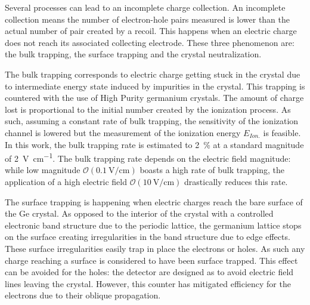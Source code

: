 Several processes can lead to an incomplete charge collection. An incomplete collection means the number of electron-hole pairs measured is lower than the actual number of pair created by a recoil. This happens when an electric charge does not reach its associated collecting electrode. These three phenomenon are: the bulk trapping, the surface trapping and the crystal neutralization.

The bulk trapping corresponds to electric charge getting stuck in the crystal due to intermediate energy state induced by impurities in the crystal. This trapping is countered with the use of High Purity germanium crystals. The amount of charge lost is proportional to the initial number created by the ionization process. As such, assuming a constant rate of bulk trapping, the sensitivity of the ionization channel is lowered but the measurement of the ionization energy $E_{Ion.}$ is feasible. In this work, the bulk trapping rate is estimated to \SI{2}{\percent} at a standard magnitude of \SI{2}{\volt\per\cm}. The bulk trapping rate depends on the electric field magnitude: while low magnitude $\mathcal{O}(\SI{0.1}{\volt\per\cm})$ boasts a high rate of bulk trapping, the application of a high electric field $\mathcal{O}(\SI{10}{\volt\per\cm})$ drastically reduces this rate.

The surface trapping is happening when electric charges reach the bare surface of the Ge crystal. As opposed to the interior of the crystal with a controlled electronic band structure due to the periodic lattice, the germanium lattice stops on the surface creating irregularities in the band structure due to edge effects. These surface irregularities easily trap in place the electrons or holes. As such any charge reaching a surface is considered to have been surface trapped. This effect can be avoided for the holes: the detector are designed as to avoid electric field lines leaving the crystal. However, this counter has mitigated efficiency for the electrons due to their oblique propagation.

